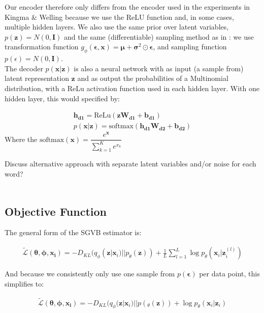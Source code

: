 \documentclass{report}
\begin{document}
Our encoder therefore only differs from the encoder used in the experiments in Kingma \& Welling \cite{kingma2013auto} because we use the ReLU function and, in some cases, multiple hidden layers. We also use the same prior over latent variables, $p(\mathbf{z}) = N(0,\textbf{I})$ and the same (differentiable) sampling method as in \cite{kingma2013auto}: we use transformation function $g_\phi(\boldsymbol{\epsilon},\mathbf{x}) = \boldsymbol{\mu} + \boldsymbol{\sigma}^2\odot \boldsymbol{\epsilon}$, and sampling function $p(\epsilon) = N(0,\textbf{I})$. \\
The decoder $p(\mathbf{x}|\mathbf{z})$ is also a neural network with as input (a sample from) latent representation $\mathbf{z}$ and as output the probabilities of a Multinomial distribution, with a ReLu activation function used in each hidden layer. With one hidden layer, this would specified by:

\begin{align}
\mathbf{h_{d1}} = \text{ReLu}(\mathbf{zW_{d1}+b_{d1}})
\\
p(\mathbf{x}|\mathbf{z}) = \text{softmax} (\mathbf{h_{d1}W_{d2}}+\mathbf{b_{d2}})
\end{align}
Where the $\text{softmax}(\mathbf{x}) = \dfrac{e^{\mathbf{x}}}{\sum_{k=1}^{K}e^{x_k}}$



Discuss alternative approach with separate latent variables and/or noise for each word?\\ \\

\subsection{Objective Function}
The general form of the SGVB estimator is:

\begin{align}
\tilde{\mathcal{L}}(\boldsymbol{\theta}, \boldsymbol{\phi}, \mathbf{x_i}) = -D_{KL}(q_\phi (\mathbf{z}|\mathbf{x}_i)||p_\theta(\mathbf{z}))  + \frac{1}{L}\sum_{l=1}^{L}\log p_\theta(\mathbf{x}_i|\mathbf{z}_i^{(l)})
\end{align}

And because we consistently only use one sample from $p(\boldsymbol{\epsilon})$ per data point, this simplifies to:

\begin{align}\label{lb_summary}
\tilde{\mathcal{L}}(\boldsymbol{\theta}, \boldsymbol{\phi}, \mathbf{x_i}) = -D_{KL}(q_\phi (\mathbf{z}|\mathbf{x}_i)||p(_\theta(\mathbf{z}))  + \log p_\theta(\mathbf{x}_i|\mathbf{z}_i)
\end{align}
\end{document}
